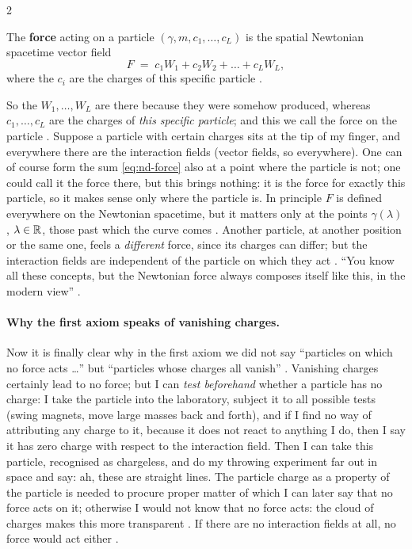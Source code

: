 \begin{paracol}{2}
\begin{definition}\label{def:nd-force}
The \textbf{force} acting on a particle $(\gamma,m,c_1,\dots,c_L)$ is the spatial Newtonian spacetime vector field
\begin{equation}\label{eq:nd-force}
  F\;=\;c_1W_1+c_2W_2+\dots+c_LW_L ,
\end{equation}
where the $c_i$ are the charges of this specific particle .
\end{definition}
So the $W_1,\dots,W_L$ are there because they were somehow produced, whereas $c_1,\dots,c_L$ are the charges of \emph{this specific particle}; and this we call the force on the particle . Suppose a particle with certain charges sits at the tip of my finger, and everywhere there are
the interaction fields (vector fields, so everywhere). One can of course form the sum \eqref{eq:nd-force} also at a point where the particle is not; one could call it the force there, but this brings nothing: it is the force for exactly this particle, so it makes sense only where the particle is.
In principle $F$ is defined everywhere on the Newtonian spacetime, but it matters only at the points $\gamma(\lambda)$, $\lambda\in\mathbb{R}$, those past which the curve comes . Another particle, at another position or the same one, feels a \emph{different} force, since its charges can
differ; but the interaction fields are independent of the particle on which they act . ``You know all these concepts, but the Newtonian force always composes itself like this, in the modern view'' .

\paragraph{Why the first axiom speaks of vanishing charges.} Now it is finally clear why in the first axiom we did not say ``particles on which no force acts \dots'' but ``particles whose charges all vanish'' . Vanishing charges certainly lead to no force; but I can \emph{test beforehand} whether a particle has no charge:
I take the particle into the laboratory, subject it to all possible tests (swing magnets, move large masses back and forth), and if I find no way of attributing any charge to it, because it does not react to anything I do, then I say it has zero charge with respect to the interaction field.
Then I can take this particle, recognised as chargeless, and do my throwing experiment far out in space and say: ah, these are straight lines. The particle charge as a property of the particle is needed to procure proper matter of which I can later say that no force acts on it; otherwise I would not know
that no force acts: the cloud of charges makes this more transparent . If there are no interaction fields at all, no force would act either .


\end{paracol}
